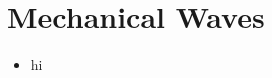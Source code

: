 \documentclass[../notes.tex]{subfiles}
\begin{document}
\chapter{Mechanical Waves}
\begin{itemize}
    \item {}hi
\end{itemize}
\end{document}
